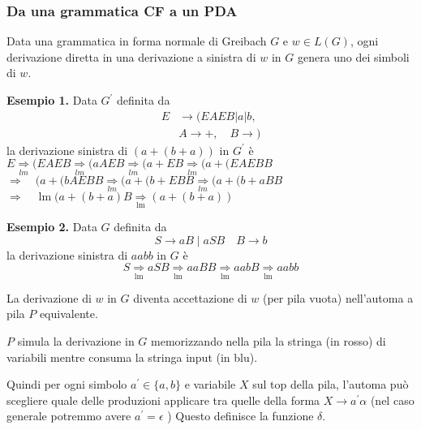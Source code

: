 \subsubsection{Da una grammatica CF a un PDA}
Data una grammatica in forma normale di Greibach $G$ e $w \in L(G)$, ogni derivazione diretta in una derivazione a sinistra di $w$ in $G$ genera uno dei simboli di $w$.

\textbf{Esempio 1.} Data $G^{\prime}$ definita da
$$
\begin{aligned}
E & \rightarrow(E A E B|a| b,\\
&A \rightarrow+, \quad B \rightarrow)
\end{aligned}
$$
la derivazione sinistra di $(a+(b+a))$ in $G^{\prime}$ è
$E \underset{l m}{\Rightarrow}(E A E B \underset{l m}{\Rightarrow}(a A E B  \underset{l m}{\Rightarrow}(a+E B \underset{l m}{\Rightarrow}(a+(E A E B B$
$\Rightarrow \quad(a+(b A E B B  \underset{l m}{\Rightarrow}(a+(b+E B B  \underset{l m}{\Rightarrow}(a+(b+a B B$
$\Rightarrow \quad \operatorname{lm}(a+(b+a) B  \underset{\operatorname{lm}}{\Rightarrow}(a+(b+a))$

\textbf{Esempio 2.} Data $G$ definita da
$$
S \rightarrow a B \mid a S B \quad B \rightarrow b
$$
la derivazione sinistra di $a a b b$ in $G$ è
$$
S \underset{\operatorname{lm}}{\Rightarrow} a S B \underset{\operatorname{lm}}{\Rightarrow} a a B B \underset{\operatorname{lm}}{\Rightarrow} a a b B \underset{\operatorname{lm}}{\Rightarrow} a a b b
$$

La derivazione di $w$ in $G$ diventa accettazione di $w$ (per pila vuota) nell'automa a pila $P$ equivalente.

$P$ simula la derivazione in $G$ memorizzando nella pila la stringa (in rosso) di variabili mentre consuma la stringa input (in blu).

Quindi per ogni simbolo $a^{\prime} \in\{a, b\}$ e variabile $X$ sul top della pila, l'automa può scegliere quale delle produzioni applicare tra quelle della forma $X \rightarrow a^{\prime} \alpha$ (nel caso generale potremmo avere $a^{\prime}=\epsilon$ )
Questo definisce la funzione $\delta$.

\vspace{5mm}

